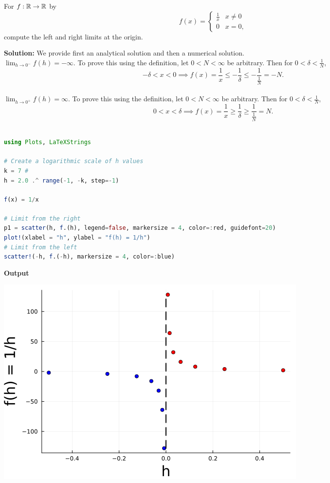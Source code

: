\begin{example} For $f:\mathbb R \to \mathbb R$ by
$$f(x) = \begin{cases}
\frac{1}{x} & x\neq 0 \\
0 & x = 0,    
\end{cases}$$
compute the left and right limits at the origin.    
\end{example}

\textbf{Solution:} We provide first an analytical solution and then a numerical solution.\\

\Ans $ \displaystyle \lim_{h \to 0^-} f(h) = -\infty$. To prove this using the definition, let $0 < N < \infty$ be arbitrary. Then for $0<\delta < \frac{1}{N}$,
$$ -\delta < x < 0 \implies f(x) = \frac{1}{x} \le -\frac{1}{\delta} \le - \frac{1}{ \frac{1}{N}} = -N.$$
\\

\Ans $ \displaystyle \lim_{h \to 0^+} f(h) = \infty$. To prove this using the definition, let $0 < N < \infty$ be arbitrary. Then for $0<\delta < \frac{1}{N}$,
$$ 0<x<\delta \implies f(x) = \frac{1}{x} \ge \frac{1}{\delta} \ge \frac{1}{\frac{1}{N}} = N.$$
\\


\begin{lstlisting}[language=Julia,style=mystyle]
using Plots, LaTeXStrings

# Create a logarithmic scale of h values
k = 7 # 
h = 2.0 .^ range(-1, -k, step=-1)

f(x) = 1/x

# Limit from the right
p1 = scatter(h, f.(h), legend=false, markersize = 4, color=:red, guidefont=20)
plot!(xlabel = "h", ylabel = "f(h) = 1/h")
# Limit from the left
scatter!(-h, f.(-h), markersize = 4, color=:blue)
\end{lstlisting}
\textbf{Output} 

\begin{center}
    \includegraphics[width=0.45\columnwidth]{graphics/Chap04/SolutionLimitLeftRightAtZero.png}
\end{center}

